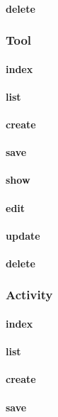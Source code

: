 \documentclass[12pt]{article}
\begin{document}
\paragraph{delete}

\subsubsection{Tool}
\paragraph{index}
\paragraph{list}
\paragraph{create}
\paragraph{save}
\paragraph{show}
\paragraph{edit}
\paragraph{update}
\paragraph{delete}

\subsubsection{Activity}
\paragraph{index}
\paragraph{list}
\paragraph{create}
\paragraph{save}
\end{document}
